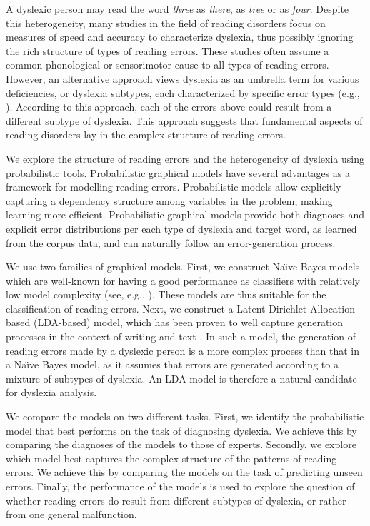 A dyslexic person may read the word \textit{three} as \textit{there}, as \textit{tree} or as \textit{four}. Despite this heterogeneity, many studies in the field of reading disorders focus on measures of speed and accuracy to characterize dyslexia, thus possibly ignoring the rich structure of types of reading errors. These studies often assume a common phonological \citep{r14, rrddcw03, s98, s01} or sensorimotor \citep{s01} cause to all types of reading errors. However, an alternative approach views dyslexia as an umbrella term for various deficiencies, or dyslexia subtypes, each characterized by specific error types (e.g., \citealp{ck12, fc15, mn73}). According to this approach, each of the errors above could result from a different subtype of dyslexia. This approach suggests that fundamental aspects of reading disorders lay in the complex structure of reading errors.

We explore the structure of reading errors and the heterogeneity of dyslexia using probabilistic tools. Probabilistic graphical models have several advantages as a framework for modelling reading errors. Probabilistic models allow explicitly capturing a dependency structure among variables in the problem, making learning more efficient. Probabilistic graphical models provide both diagnoses and explicit error distributions per each type of dyslexia and target word, as learned from the corpus data, and can naturally follow an error-generation process.

We use two families of graphical models. First, we construct Na\"{\i}ve Bayes models which are well-known for having a good performance as classifiers with relatively low model complexity (see, e.g., \citealp{lit92}). These models are thus suitable for the classification of reading errors. Next, we construct a Latent Dirichlet Allocation based (LDA-based) model, which has been proven to well capture generation processes in the context of writing and text \citep{bnj03, rgss04}. In such a model, the generation of reading errors made by a dyslexic person is a more complex process than that in a Na\"{\i}ve Bayes model, as it assumes that errors are generated according to a mixture of subtypes of dyslexia. An LDA model is therefore a natural candidate for dyslexia analysis.

We compare the models on two different tasks. First, we identify the probabilistic model that best performs on the task of diagnosing dyslexia. We achieve this by comparing the diagnoses of the models to those of experts. Secondly, we explore which model best captures the complex structure of the patterns of reading errors. We achieve this by comparing the models on the task of predicting unseen errors. Finally, the performance of the models is used to explore the question of whether reading errors do result from different subtypes of dyslexia, or rather from one general malfunction.

